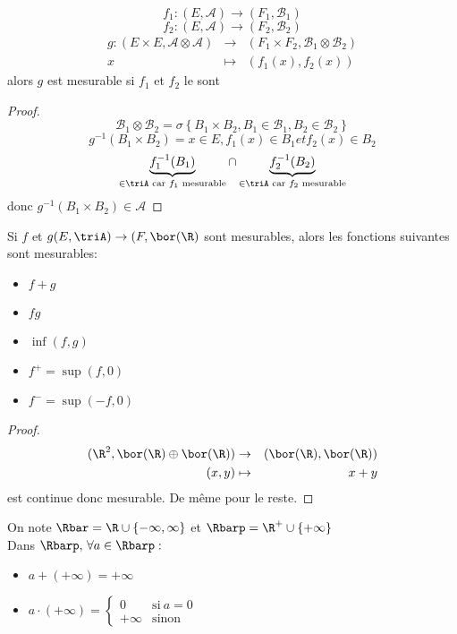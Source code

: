 \begin{prop}
	$$f_1 : (E,\mathscr{A}) \rightarrow (F_1,\mathscr{B}_1)$$
	$$f_2 : (E,\mathscr{A}) \rightarrow (F_2,\mathscr{B}_2)$$
	\begin{eqnarray*}
		g: (E \times E,\mathscr{A} \otimes \mathscr{A}) &\rightarrow& (F_1 \times F_2,\mathscr{B}_1 \otimes \mathscr{B}_2)\\
		x &\mapsto& (f_1(x), f_2(x))
	\end{eqnarray*}
	alors $g$ est mesurable si $f_1$ et $f_2$ le sont
\end{prop}

\begin{proof}
	$$\mathscr{B_1} \otimes \mathscr{B}_2 = \sigma \left\{ B_1 \times B_2, B_1 \in \mathscr{B}_1, B_2 \in \mathscr{B}_2 \right\}$$
	$$g^{-1}(B_1 \times B_2) = {x \in E, f_1(x) \in B_1 et f_2(x) \in B_2  }$$
	$$ \underbrace{f_1^{-1}(B_1)}_{\in \triA \text{ car } f_1 \text{ mesurable}} \cap \underbrace{f_2^{-1}(B_2)}_{\in \triA \text{ car } f_2 \text{ mesurable}}$$
	donc $g^{-1}(B_1 \times B_2) \in \mathscr{A}$
\end{proof}

\begin{prop}
	Si $f$ et $g (E,\triA) \rightarrow (F,\bor(\R)$
	sont mesurables, alors les fonctions suivantes sont mesurables:
	\begin{itemize}
		\item $f + g$
		\item $fg$
		\item $\inf(f,g)$
		\item $f^+ = \sup(f,0)$
		\item $f^- = \sup(-f,0)$
	\end{itemize}
\end{prop}

\begin{proof}
	\begin{eqnarray*}
		(\R^2, \bor(\R) \oplus \bor(\R))   &\rightarrow& (\bor(\R), \bor(\R)) \\
		(x,y) &\mapsto& x + y
	\end{eqnarray*}
	est continue donc mesurable. De même pour le reste.
\end{proof}


\begin{definition}
	On note $\Rbar = \R \cup \{ -\infty, \infty \}$ et $\Rbarp = \R^+ \cup \{  +\infty \}$\\
	Dans $\Rbarp , \, \forall a \in \Rbarp: $
	\begin{itemize}
		\item $a + (+\infty) = +\infty$
		\item $a \cdot (+\infty) = \left\{ \begin{array}{cc}
				      0       & \text{si} \  a = 0 \\
				      +\infty & \text{sinon}
			      \end{array}\right.$
	\end{itemize}
\end{definition}

